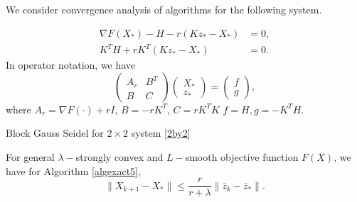 We consider convergence analysis of algorithms for the following system.

\begin{equation} \label{2by2}
\begin{aligned}
\nabla F(X_{*}) - H - r (Kz_{*} - X_{*}) &= 0, \\
K^T H + r K^T (Kz_{*} - X_{*}) &= 0.
\end{aligned}
\end{equation}
In operator notation, we have 
\begin{equation}
\begin{pmatrix}\label{2by2abstract}
A_r & B^T\\
B & C
\end{pmatrix} 
\begin{pmatrix}
X_*\\
z_*
\end{pmatrix}= 
\begin{pmatrix}
f  \\
g 
\end{pmatrix},
\end{equation}
where $A_r = \nabla F(\cdot) + r I $, $B = -r K^T$, $C = rK^T K $ $f = H, g = -K^T H$. 


\begin{algorithm}
\caption{Block Gauss Seidel for $2 \times 2$ system \eqref{2by2}}
\label{algexact5}
\begin{algorithmic}
\EndFor
\end{algorithmic}
\end{algorithm}

\begin{theorem}
For general $\lambda-$strongly convex and $L-$smooth objective function $F(X)$, we have for Algorithm \ref{algexact5}, 
\begin{equation}
    \|X_{k+1} - X_{*} \| \leq \frac{r}{r + \lambda} \| \bar{z}_k - \bar{z}_* \|.
\end{equation}
\end{theorem}

